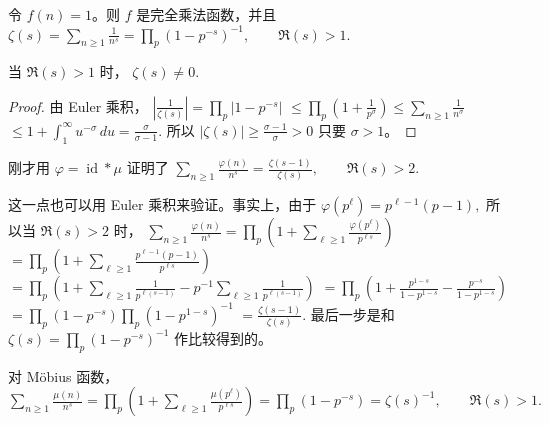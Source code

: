 \begin{example}
	令 $f(n)=1$。则 $f$ 是完全乘法函数，并且
	\(\textstyle \zeta(s) =\allowbreak{} \sum_{n\geq\allowbreak{} 1}\frac1{n^s} =\allowbreak{} \prod_p(1-p^{-s})^{-1},\allowbreak{} \qquad \Re(s)>1.\)
\end{example}

\begin{corollary}[原文 Corollary 4.8]
	当 $\Re(s)>1$ 时，
	\(\textstyle \zeta(s)\neq\allowbreak{} 0.\)
\end{corollary}

\begin{proof}
	由 Euler 乘积，
	\(\textstyle \left|\frac1{\zeta(s)}\right| =\allowbreak{} \prod_p|1-p^{-s}|\) \(\textstyle \leq\allowbreak{} \prod_p\left(1+\allowbreak{}\frac1{p^\sigma}\right) \leq\allowbreak{} \sum_{n\geq\allowbreak{} 1}\frac1{n^\sigma}\) \(\textstyle \leq\allowbreak{} 1+\allowbreak{}\int_1^\infty u^{-\sigma}\,du =\allowbreak{} \frac{\sigma}{\sigma-1}.\)
	所以
	\(\textstyle |\zeta(s)|\geq\allowbreak{}\frac{\sigma-1}{\sigma}>0\)
	只要 $\sigma>1$。
\end{proof}

\begin{example}
	刚才用 $\varphi=\operatorname{id}*\mu$ 证明了
	\(\textstyle \sum_{n\geq\allowbreak{} 1}\frac{\varphi(n)}{n^s} =\allowbreak{} \frac{\zeta(s-1)}{\zeta(s)},\allowbreak{} \qquad \Re(s)>2.\)
\end{example}


这一点也可以用 Euler 乘积来验证。事实上，由于
\(\textstyle \varphi(p^\ell)=\allowbreak{}p^{\ell-1}(p-1),\allowbreak{}\)
所以当 $\Re(s)>2$ 时，
\(\textstyle \sum_{n\geq\allowbreak{} 1}\frac{\varphi(n)}{n^s} =\allowbreak{} \prod_p\left(1+\allowbreak{}\sum_{\ell\geq\allowbreak{} 1} \frac{\varphi(p^\ell)}{p^{\ell s}}\right)\) \(\textstyle =\allowbreak{} \prod_p\left(1+\allowbreak{}\sum_{\ell\geq\allowbreak{} 1} \frac{p^{\ell-1}(p-1)}{p^{\ell s}}\right)\) \(\textstyle =\allowbreak{} \prod_p\left(1+\allowbreak{}\sum_{\ell\geq\allowbreak{} 1} \frac1{p^{\ell(s-1)}}- p^{-1}\sum_{\ell\geq\allowbreak{} 1}\frac1{p^{\ell(s-1)}}\right)\) \(\textstyle =\allowbreak{} \prod_p\left(1+\allowbreak{}\frac{p^{1-s}}{1-p^{1-s}} -\frac{p^{-s}}{1-p^{1-s}}\right)\) \(\textstyle =\allowbreak{} \prod_p(1-p^{-s})\prod_p(1-p^{1-s})^{-1}\) \(\textstyle =\allowbreak{} \frac{\zeta(s-1)}{\zeta(s)}.\)
最后一步是和
\(\textstyle \zeta(s)=\allowbreak{}\prod_p(1-p^{-s})^{-1}\)
作比较得到的。

\begin{example}
	对 Möbius 函数，
	\(\textstyle \sum_{n\geq\allowbreak{} 1}\frac{\mu(n)}{n^s} =\allowbreak{} \prod_p\left(1+\allowbreak{}\sum_{\ell\geq\allowbreak{} 1} \frac{\mu(p^\ell)}{p^{\ell s}}\right) =\allowbreak{} \prod_p(1-p^{-s}) =\allowbreak{} \zeta(s)^{-1},\allowbreak{} \qquad \Re(s)>1.\)
\end{example}

